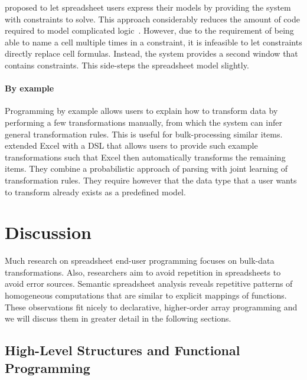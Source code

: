 \documentclass[a4paper]{article}
\begin{document}
\citet{Stadelmann:1993:SBC:168642.168664} proposed to let spreadsheet users express their models by providing the system with constraints to solve. This approach considerably reduces the amount of code required to model complicated logic~\cite{Stadelmann:1993:SBC:168642.168664}. However, due to the requirement of being able to name a cell multiple times in a constraint, it is infeasible to let constraints directly replace cell formulas. Instead, the system provides a second window that contains constraints. This side-steps the spreadsheet model slightly.

\paragraph{By example}

Programming by example allows users to explain how to transform data by performing a few transformations manually, from which the system can infer general transformation rules. This is useful for bulk-processing similar items. \citet{Singh:2016:TSD:2837614.2837668} extended Excel with a DSL that allows users to provide such example transformations such that Excel then automatically transforms the remaining items. They combine a probabilistic approach of parsing with joint learning of transformation rules. They require however that the data type that a user wants to transform already exists as a predefined model.

\section{Discussion}
\label{sec:discussion}

Much research on spreadsheet end-user programming focuses on bulk-data transformations. Also, researchers aim to avoid repetition in spreadsheets to avoid error sources. Semantic spreadsheet analysis reveals repetitive patterns of homogeneous computations that are similar to explicit mappings of functions. These observations fit nicely to declarative, higher-order array programming and we will discuss them in greater detail in the following sections.

\subsection{High-Level Structures and Functional Programming}
\label{sec:high-level-struct}
\end{document}
